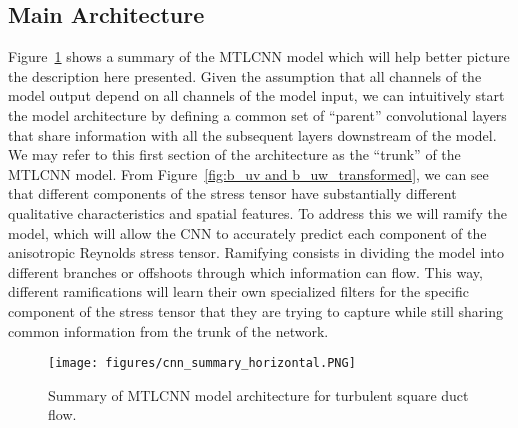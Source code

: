 \documentclass[11pt]{article}
\numberwithin{equation}{section}
\theoremstyle{plain}
\theoremstyle{definition}
\begin{document}
\subsection{Main Architecture}
\label{subsec: Main Architecture}


Figure~\ref{fig:summary_of_architecture} shows a summary of the MTLCNN model which will help better picture the description here presented. Given the assumption that all channels of the model output depend on all channels of the model input, we can intuitively start the model architecture by defining a common set of ``parent'' convolutional layers that share information with all the subsequent layers downstream of the model. We may refer to this first section of the architecture as the ``trunk'' of the MTLCNN model. From Figure~\ref{fig:b_uv and b_uw_transformed}, we can see that different components of the stress tensor have substantially different qualitative characteristics and spatial features. To address this we will ramify the model, which will allow the CNN to accurately predict each component of the anisotropic Reynolds stress tensor. Ramifying consists in dividing the model into different branches or offshoots through which information can flow. This way, different ramifications will learn their own specialized filters for the specific component of the stress tensor that they are trying to capture while still sharing common information from the trunk of the network. 

\begin{figure}[htb!]
\centering
\texttt{[image: figures/cnn\_summary\_horizontal.PNG]}
\caption{Summary of MTLCNN model architecture for turbulent square duct flow.}
\label{fig:summary_of_architecture}
\end{figure}
\end{document}
